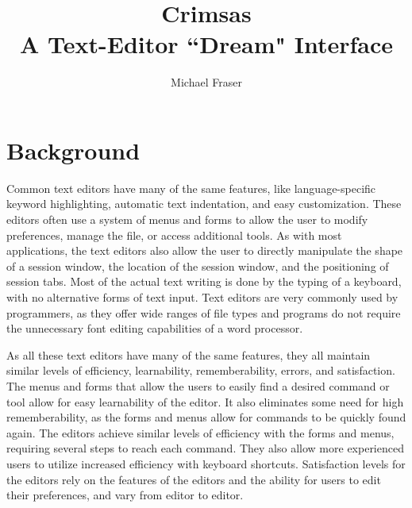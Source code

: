 \documentclass[11pt, oneside]{article}
\begin{document}
\title{Crimsas \\ A Text-Editor ``Dream" Interface}
\author{Michael Fraser}
\maketitle

\tableofcontents

\section{Background}
Common text editors have many of the same features, like language-specific keyword highlighting, automatic text indentation, and easy customization. These editors often use a system of menus and forms to allow the user to modify preferences, manage the file, or access additional tools. As with most applications, the text editors also allow the user to directly manipulate the shape of a session window, the location of the session window, and the positioning of session tabs. Most of the actual text writing is done by the typing of a keyboard, with no alternative forms of text input. Text editors are very commonly used by programmers, as they offer wide ranges of file types and programs do not require the unnecessary font editing capabilities of a word processor.

As all these text editors have many of the same features, they all maintain similar levels of efficiency, learnability, rememberability, errors, and satisfaction. The menus and forms that allow the users to easily find a desired command or tool allow for easy learnability of the editor. It also eliminates some need for high rememberability, as the forms and menus allow for commands to be quickly found again. The editors achieve similar levels of efficiency with the forms and menus, requiring several steps to reach each command. They also allow more experienced users to utilize increased efficiency with keyboard shortcuts. Satisfaction levels for the editors rely on the features of the editors and the ability for users to edit their preferences, and vary from editor to editor. %
\end{document}

